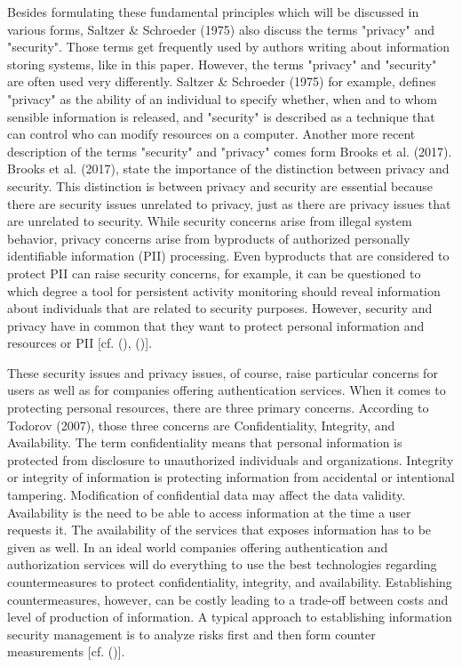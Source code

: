 Besides formulating these fundamental principles which will be discussed in various forms,  Saltzer \& Schroeder (1975) also discuss the terms "privacy" and "security". Those terms get frequently used by authors writing about information storing systems, like in this paper. However, the terms "privacy" and "security" are often used very differently.  Saltzer \& Schroeder (1975) for example, defines "privacy" as the ability of an individual to specify whether, when and to whom sensible information is released, and "security" is described as a technique that can control who can modify resources on a computer. Another more recent description of the terms "security" and "privacy" comes form Brooks et al. (2017). Brooks et al. (2017), state the importance of the distinction between privacy and security. This distinction is between privacy and security are essential because there are security issues unrelated to privacy, just as there are privacy issues that are unrelated to security. While security concerns arise from illegal system behavior, privacy concerns arise from byproducts of authorized personally identifiable information (PII) processing. Even byproducts that are considered to protect PII can raise security concerns, for example, it can be questioned to which degree a tool for persistent activity monitoring should reveal information about individuals that are related to security purposes. However, security and privacy have in common that they want to protect personal information and resources or PII [cf. (\cite{Brooks:2017:IPE}), (\cite{Saltzer:PICS})].

These security issues and privacy issues, of course, raise particular concerns for users as well as for companies offering authentication services. When it comes to protecting personal resources, there are three primary concerns. According to Todorov (2007), those three concerns are Confidentiality, Integrity, and Availability. The term confidentiality means that personal information is protected from disclosure to unauthorized individuals and organizations. Integrity or integrity of information is protecting information from accidental or intentional tampering. Modification of confidential data may affect the data validity. Availability is the need to be able to access information at the time a user requests it. The availability of the services that exposes information has to be given as well. In an ideal world companies offering authentication and authorization services will do everything to use the best technologies regarding countermeasures to protect confidentiality, integrity, and availability. Establishing countermeasures, however, can be costly leading to a trade-off between costs and level of production of information. A typical approach to establishing information security management is to analyze risks first and then form counter measurements [cf. (\cite{Todorov:2007:MUI})]. 

